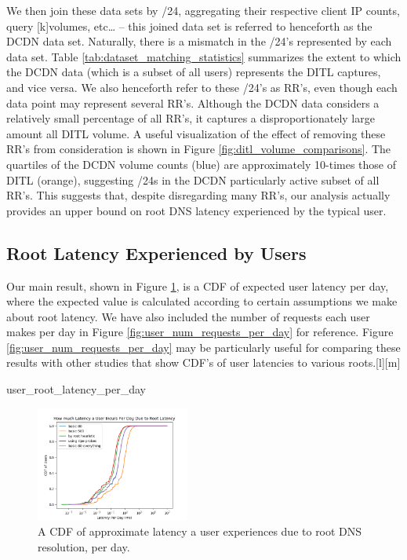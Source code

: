 \documentclass[sigconf,nonacm,10pt]{acmart}
\begin{document}
We then join these data sets by /24, aggregating their respective client
IP counts, query {[}k{]}volumes, etc\ldots{} -- this joined data set is
referred to henceforth as the DCDN data set. Naturally, there is a
mismatch in the /24's represented by each data set. Table
\ref{tab:dataset_matching_statistics} summarizes the extent to which the
DCDN data (which is a subset of all users) represents the DITL captures,
and vice versa. We also henceforth refer to these /24's as RR's, even
though each data point may represent several RR's. Although the DCDN
data considers a relatively small percentage of all RR's, it captures a
disproportionately large amount all DITL volume. A useful visualization
of the effect of removing these RR's from consideration is shown in
Figure \ref{fig:ditl_volume_comparisons}. The quartiles of the DCDN
volume counts (blue) are approximately 10-times those of DITL (orange),
suggesting /24s in the DCDN particularly active subset of all RR's. This
suggests that, despite disregarding many RR's, our analysis actually
provides an upper bound on root DNS latency experienced by the typical
user.

\subsection{Root Latency Experienced by
Users}\label{root-latency-experienced-by-users-1}

Our main result, shown in Figure \ref{fig:user_root_latency_per_day}, is
a CDF of expected user latency per day, where the expected value is
calculated according to certain assumptions we make about root latency.
We have also included the number of requests each user makes per day in
Figure \ref{fig:user_num_requests_per_day} for reference. Figure
\ref{fig:user_num_requests_per_day} may be particularly useful for
comparing these results with other studies that show CDF's of user
latencies to various roots.{[}l{]}{[}m{]}

user\_root\_latency\_per\_day

\begin{figure}
    \centering
    \includegraphics[width=0.45\textwidth]{figures/user_root_latency_per_day.png}
    \caption{A CDF of approximate latency a user experiences due to root DNS resolution, per day.}
    \label{fig:user_root_latency_per_day}
\end{figure}
\end{document}
